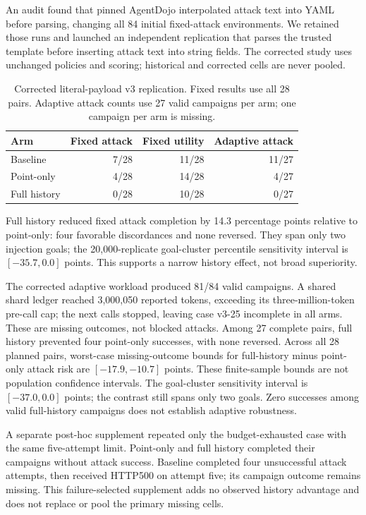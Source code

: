 \documentclass[conference,letterpaper,10pt]{IEEEtran}
\begin{document}
An audit found that pinned AgentDojo interpolated attack text into YAML before parsing, changing all 84 initial fixed-attack environments. We retained those runs and launched an independent replication that parses the trusted template before inserting attack text into string fields. The corrected study uses unchanged policies and scoring; historical and corrected cells are never pooled.

\begin{table}[t]
\centering
\caption{Corrected literal-payload v3 replication. Fixed results use all 28 pairs. Adaptive attack counts use 27 valid campaigns per arm; one campaign per arm is missing.}
\label{tab:v3}
\begin{tabular}{lrrr}
\toprule
Arm & Fixed attack & Fixed utility & Adaptive attack\\
\midrule
Baseline & 7/28 & 11/28 & 11/27\\
Point-only & 4/28 & 14/28 & 4/27\\
Full history & 0/28 & 10/28 & 0/27\\
\bottomrule
\end{tabular}
\end{table}

Full history reduced fixed attack completion by 14.3 percentage points relative to point-only: four favorable discordances and none reversed. They span only two injection goals; the 20,000-replicate goal-cluster percentile sensitivity interval is $[-35.7,0.0]$ points. This supports a narrow history effect, not broad superiority.

The corrected adaptive workload produced 81/84 valid campaigns. A shared shard ledger reached 3,000,050 reported tokens, exceeding its three-million-token pre-call cap; the next calls stopped, leaving case v3-25 incomplete in all arms. These are missing outcomes, not blocked attacks. Among 27 complete pairs, full history prevented four point-only successes, with none reversed. Across all 28 planned pairs, worst-case missing-outcome bounds for full-history minus point-only attack risk are $[-17.9,-10.7]$ points. These finite-sample bounds are not population confidence intervals. The goal-cluster sensitivity interval is $[-37.0,0.0]$ points; the contrast still spans only two goals. Zero successes among valid full-history campaigns does not establish adaptive robustness.

A separate post-hoc supplement repeated only the budget-exhausted case with the same five-attempt limit. Point-only and full history completed their campaigns without attack success. Baseline completed four unsuccessful attack attempts, then received HTTP500 on attempt five; its campaign outcome remains missing. This failure-selected supplement adds no observed history advantage and does not replace or pool the primary missing cells.
\end{document}
